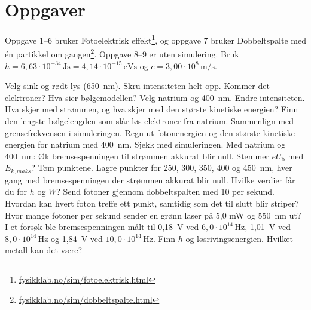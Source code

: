 \documentclass[11pt]{article}
\begin{document}

\section*{Oppgaver}

Oppgave 1–6 bruker Fotoelektrisk effekt\footnote{\url{fysikklab.no/sim/fotoelektrisk.html}}, og oppgave 7 bruker Dobbeltspalte med én partikkel om gangen\footnote{\url{fysikklab.no/sim/dobbeltspalte.html}}. Oppgave 8–9 er uten simulering. Bruk $h = 6{,}63 \cdot 10^{-34}\,\mathrm{Js} = 4{,}14 \cdot 10^{-15}\,\mathrm{eVs}$ og $c = 3{,}00 \cdot 10^{8}\,\mathrm{m/s}$.

\begin{oppgaveliste}
\oppgave {}Velg sink og rødt lys (650~nm). Skru intensiteten helt opp. Kommer det elektroner? Hva sier bølgemodellen?
\svar
\oppgave {}Velg natrium og 400~nm. Endre intensiteten. Hva skjer med strømmen, og hva skjer med den største kinetiske energien?
\svar
\oppgave {}Finn den lengste bølgelengden som slår løs elektroner fra natrium. Sammenlign med grensefrekvensen i simuleringen.
\svar
\oppgave {}Regn ut fotonenergien og den største kinetiske energien for natrium med 400~nm. Sjekk med simuleringen.
\svar
\oppgave {}Med natrium og 400~nm: Øk bremsespenningen til strømmen akkurat blir null. Stemmer $eU_{\mathrm{b}}$ med $E_{k,maks}$?
\svar
\oppgave {}Tøm punktene. Lagre punkter for 250, 300, 350, 400 og 450~nm, hver gang med bremsespenningen der strømmen akkurat blir null. Hvilke verdier får du for $h$ og $W$?
\svar
\oppgave {}Send fotoner gjennom dobbeltspalten med 10 per sekund. Hvordan kan hvert foton treffe ett punkt, samtidig som det til slutt blir striper?
\svar
\oppgave {}Hvor mange fotoner per sekund sender en grønn laser på 5,0 mW og 550~nm ut?
\svar
\oppgave {}I et forsøk ble bremsespenningen målt til 0,18~V ved $6{,}0 \cdot 10^{14}\,\mathrm{Hz}$, 1,01~V ved $8{,}0 \cdot 10^{14}\,\mathrm{Hz}$ og 1,84~V ved $10{,}0 \cdot 10^{14}\,\mathrm{Hz}$. Finn $h$ og løsrivingsenergien. Hvilket metall kan det være?
\svar
\end{oppgaveliste}
\end{document}
